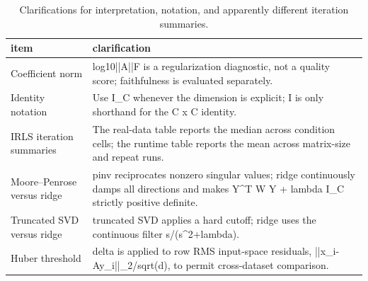 \begin{table}[t]
\caption{Clarifications for interpretation, notation, and apparently different iteration summaries.}
\label{tab:r5_final_reporting_clarifications}
\begin{tabular}{ll}
\toprule
item & clarification \\
\midrule
Coefficient norm & log10||A||F is a regularization diagnostic, not a quality score; faithfulness is evaluated separately. \\
Identity notation & Use I_C whenever the dimension is explicit; I is only shorthand for the C x C identity. \\
IRLS iteration summaries & The real-data table reports the median across condition cells; the runtime table reports the mean across matrix-size and repeat runs. \\
Moore–Penrose versus ridge & pinv reciprocates nonzero singular values; ridge continuously damps all directions and makes Y^T W Y + lambda I_C strictly positive definite. \\
Truncated SVD versus ridge & truncated SVD applies a hard cutoff; ridge uses the continuous filter s/(s^2+lambda). \\
Huber threshold & delta is applied to row RMS input-space residuals, ||x_i-Ay_i||_2/sqrt(d), to permit cross-dataset comparison. \\
\bottomrule
\end{tabular}
\end{table}
